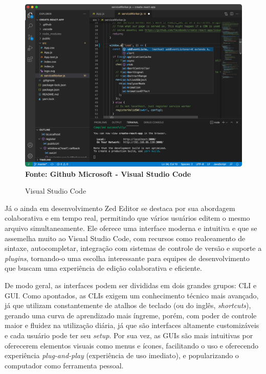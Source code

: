 \FloatBarrier
\begin{figure}[!htbp]
    \centering
    \caption{Visual Studio Code}
    \includegraphics[scale=0.3]{imagens/VSCode.png}
    \\\textbf{Fonte: Github Microsoft - Visual Studio Code} \label{fig:VSCode}
\end{figure}
\FloatBarrier

Já o ainda em desenvolvimento Zed Editor se destaca por sua abordagem colaborativa
e em tempo real, permitindo que vários usuários editem o mesmo arquivo
simultaneamente. Ele oferece uma interface moderna e intuitiva e que se assemelha
muito ao Visual Studio Code, com recursos como realceamento de sintaxe, autocompletar,
integração com sistemas de controle de versão e suporte a \textit{plugins},
tornando-o uma escolha interessante para equipes de desenvolvimento que buscam
uma experiência de edição colaborativa e eficiente.

De modo geral, as interfaces podem ser divididas em dois grandes grupos: CLI e
GUI. Como apontados, as CLIs exigem um conhecimento técnico mais avançado, já que
utilizam constantemente de atalhos de teclado (ou do inglês, \textit{shortcuts}),
gerando uma curva de aprendizado mais íngreme, porém, com poder de controle
maior e fluidez na utilização diária, já que são interfaces altamente customizáveis
e cada usuário pode ter seu \textit{setup}. Por sua vez, as GUIs são mais
intuitivas por oferecerem elementos visuais como menus e ícones, facilitando o uso
e oferecendo experiência \textit{plug-and-play} (experiência de uso imediato), e
popularizando o computador como ferramenta pessoal.

